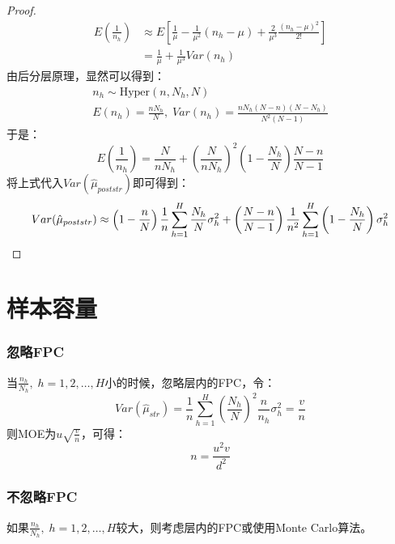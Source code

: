 \begin{proof}
	\begin{align*}
		E\left(\frac{1}{n_h}\right)
		&\approx E\left[\frac{1}{\mu}-\frac{1}{\mu^2}(n_h-\mu)+\frac{2}{\mu^3}\frac{(n_h-\mu)^2}{2!}\right] \\
		&=\frac{1}{\mu}+\frac{1}{\mu^3}Var(n_h)
	\end{align*}
	由后分层原理，显然可以得到：
	\begin{gather*}
		n_h\sim \text{Hyper}(n,N_h,N) \\
		E(n_h)=\frac{nN_h}{N},\;Var(n_h)=\frac{nN_h(N-n)(N-N_h)}{N^2(N-1)}
	\end{gather*}
	于是：
	\begin{equation*}
		E\left(\frac{1}{n_h}\right)=\frac{N}{nN_h}+\left(\frac{N}{nN_h}\right)^2\left(1-\frac{N_h}{N}\right)\frac{N-n}{N-1}
	\end{equation*}
	将上式代入$Var(\hat{\mu}_{poststr})$即可得到：
	\begin{equation*}
		Var(\hat{\mu}_{poststr})\approx\left(1-\frac{n}{N}\right)\frac{1}{n}\sum_{h=1}^H\frac{N_h}{N}\sigma_h^2+\left(\frac{N-n}{N-1}\right)\frac{1}{n^2}\sum_{h=1}^H\left(1-\frac{N_h}{N}\right)\sigma_h^2\qedhere
	\end{equation*}
\end{proof}

\section{样本容量}
\subsubsection{忽略FPC}
当$\frac{n_h}{N_h},\;h=1,2,\dots,H$小的时候，忽略层内的FPC，令：
\begin{equation*}
	Var(\hat{\mu}_{str})=\frac{1}{n}\sum_{h=1}^H\left(\frac{N_h}{N}\right)^2\frac{n}{n_h}\sigma_h^2=\frac{v}{n}
\end{equation*}
则MOE为$u\sqrt{\frac{v}{n}}$，可得：
\begin{equation*}
	n=\frac{u^2v}{d^2}
\end{equation*}
\subsubsection{不忽略FPC}
如果$\frac{n_h}{N_h},\;h=1,2,\dots,H$较大，则考虑层内的FPC或使用Monte Carlo算法。



